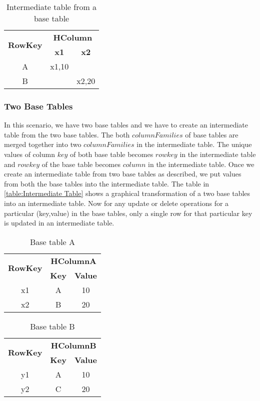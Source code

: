 \documentclass[11pt,a4paper,bibtotoc,idxtotoc,headsepline,footsepline,footexclude,BCOR12mm,DIV13]{scrbook}
\begin{document}
\begin{table*}[htb!]
	\centering
	\begin{tabular}{|c|c|c|}
		\hline
		\multirow{2}{*}{\textbf{RowKey}} & \multicolumn{2}{c|}{\textbf{HColumn}}\\
		\cline{2-3}
		& \textbf{x1} & \textbf{x2}\\
		\hline
		A & x1,10 & \\
		\hline
		B &  & x2,20\\
		
		\hline
	\end{tabular}
	\caption{Intermediate table from a base table}
	\label{HBase:IntermediateTable}
\end{table*}

\subsubsection{Two Base Tables}
\label{Two Base Tables}
In this scenario, we have two base tables and we have to create an intermediate table from the two base tables. The both $columnFamilies$ of base tables are merged together into two $columnFamilies$ in the intermediate table. The unique values of column $key$ of both base table becomes $row key$ in the intermediate table and $row key$ of the base table becomes $column$ in the intermediate table. Once we create an intermediate table from two base tables as described, we put values from both the base tables into the intermediate table. The table in \ref{table:Intermediate Table} shows a graphical transformation of a two base tables into an intermediate table. Now for any update or delete operations for a particular (key,value) in the base tables, only a single row for that particular key is updated in an intermediate table.

\begin{table*}[htb!]
	\centering
	\begin{tabular}{|c|c|c|}
		\hline
		\multirow{2}{*}{\textbf{RowKey}} & \multicolumn{2}{c|}{\textbf{HColumnA}}\\
		\cline{2-3}
		& \textbf{Key} & \textbf{Value}\\
		\hline
		x1 & A & 10\\
		\hline
		x2 & B & 20\\
		
		\hline
	\end{tabular}
	\caption{Base table A}
	\label{table:BaseTable1}
\end{table*}

\begin{table*}[htb!]
	\centering
	\begin{tabular}{|c|c|c|}
		\hline
		\multirow{2}{*}{\textbf{RowKey}} & \multicolumn{2}{c|}{\textbf{HColumnB}}\\
		\cline{2-3}
		& \textbf{Key} & \textbf{Value}\\
		\hline
		y1 & A & 10\\
		\hline
		y2 & C & 20\\
		
		\hline
	\end{tabular}
	\caption{Base table B}
	\label{table:BaseTable2}
\end{table*}
\end{document}
